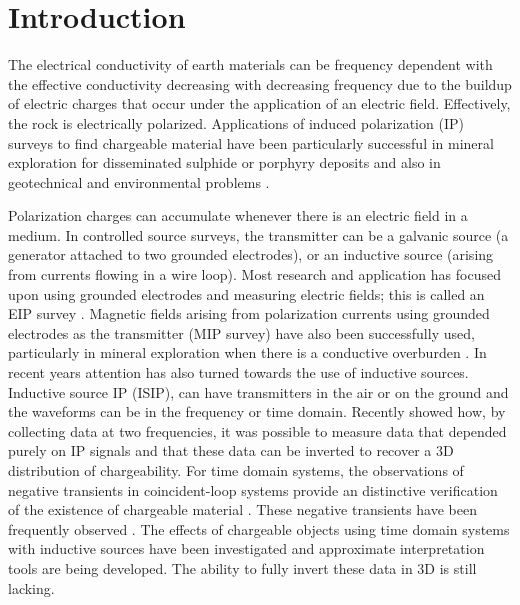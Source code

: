 \documentclass[extra,mreferee]{gji}
\begin{document}

\linenumbers
\section{Introduction}
The electrical conductivity of earth materials can be frequency dependent with the effective conductivity decreasing with decreasing frequency due to the buildup of electric charges that occur under the application of an electric field. Effectively, the rock is electrically polarized.
Applications of induced polarization (IP) surveys to find chargeable material  have been particularly successful in mineral exploration for disseminated sulphide or porphyry deposits \cite[]{Pelton1978, Fink1990} and also in geotechnical and environmental problems \cite[]{Li2000,Kemna2012}.

Polarization charges can accumulate whenever there is an electric field in a medium. In controlled source surveys, the transmitter can be a galvanic source (a generator attached to two grounded electrodes), or an inductive source (arising from currents flowing in a wire loop). Most research and application has focused upon using grounded electrodes and measuring electric fields; this is called an EIP survey \cite[]{seigel1959}. Magnetic fields arising from polarization currents using grounded electrodes as the transmitter (MIP survey) have also been successfully used, particularly in mineral exploration when there is a conductive overburden \cite[]{seigel1974}. In recent years attention has also turned towards the use of inductive sources. Inductive source IP (ISIP), can have transmitters in the air or on the ground and the waveforms can be in the frequency or time domain. Recently  \cite[]{Marchant2012b} showed how, by collecting data at two frequencies, it was possible to measure data that depended purely on IP signals and that these data can be inverted to recover a 3D distribution of chargeability.
For time domain systems, the observations of negative transients in coincident-loop systems provide an distinctive verification of the existence of chargeable material \cite[]{Weidelt1982}. These negative transients have been frequently observed \cite[]{SmithandKlein,Kang2015a}. The effects of chargeable objects using time domain systems with inductive sources have been investigated \cite[]{Smith1988a,Flis1989,ElKaliouby2004, Marchant2014} and approximate interpretation tools \cite[]{Kratzer2012,Hodges2014} are being developed. The ability to fully invert these data in 3D is still lacking.
\end{document}
